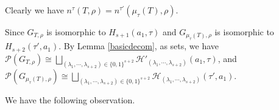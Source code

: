 \documentclass[10pt]{amsart}
\theoremstyle{theorems}
\begin{document}

\medskip

Clearly we have $n^{\tau}(T,\rho)=n^{\tau'}(\mu_{\tau}(T),\rho)$.

\medskip

Since $G_{T,\rho}$ is isomorphic to $H_{s+1}(a_1,\tau)$ and $G_{\mu_{\tau}(T),\rho}$ is isomorphic to $H_{s+2}(\tau',a_1)$. By Lemma \ref{basicdecom}, as sets, we have $\mathcal P(G_{T,\rho})\cong\bigsqcup_{(\lambda_1,\cdots,\lambda_{s+2})\in \{0,1\}^{s+2}}\mathcal H'_{(\lambda_1,\cdots,\lambda_{s+2})}(a_1,\tau)$, and  $\mathcal P(G_{\mu_{\tau}(T),\rho})\cong\bigsqcup_{(\lambda_1,\cdots,\lambda_{s+2})\in \{0,1\}^{s+2}}\mathcal H_{(\lambda_1,\cdots,\lambda_{s+2})}(\tau',a_1)$.


\medskip

We have the following observation.

\medskip
\end{document}
